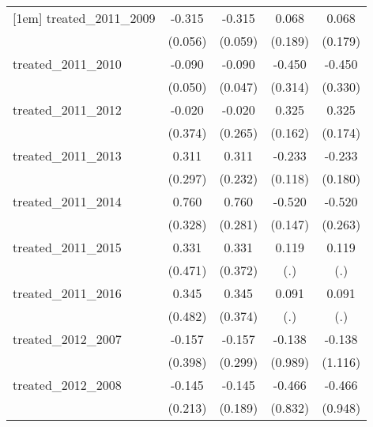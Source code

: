 {\begin{tabular}{l*{4}{c}}
[1em]
treated\_2011\_2009&      -0.315\sym{***}&      -0.315\sym{***}&       0.068         &       0.068         \\
            &     (0.056)         &     (0.059)         &     (0.189)         &     (0.179)         \\
[1em]
treated\_2011\_2010&      -0.090         &      -0.090         &      -0.450         &      -0.450         \\
            &     (0.050)         &     (0.047)         &     (0.314)         &     (0.330)         \\
[1em]
treated\_2011\_2012&      -0.020         &      -0.020         &       0.325\sym{*}  &       0.325         \\
            &     (0.374)         &     (0.265)         &     (0.162)         &     (0.174)         \\
[1em]
treated\_2011\_2013&       0.311         &       0.311         &      -0.233\sym{*}  &      -0.233         \\
            &     (0.297)         &     (0.232)         &     (0.118)         &     (0.180)         \\
[1em]
treated\_2011\_2014&       0.760\sym{*}  &       0.760\sym{**} &      -0.520\sym{***}&      -0.520\sym{*}  \\
            &     (0.328)         &     (0.281)         &     (0.147)         &     (0.263)         \\
[1em]
treated\_2011\_2015&       0.331         &       0.331         &       0.119         &       0.119         \\
            &     (0.471)         &     (0.372)         &         (.)         &         (.)         \\
[1em]
treated\_2011\_2016&       0.345         &       0.345         &       0.091         &       0.091         \\
            &     (0.482)         &     (0.374)         &         (.)         &         (.)         \\
[1em]
treated\_2012\_2007&      -0.157         &      -0.157         &      -0.138         &      -0.138         \\
            &     (0.398)         &     (0.299)         &     (0.989)         &     (1.116)         \\
[1em]
treated\_2012\_2008&      -0.145         &      -0.145         &      -0.466         &      -0.466         \\
            &     (0.213)         &     (0.189)         &     (0.832)         &     (0.948)         \\

\end{tabular}}

